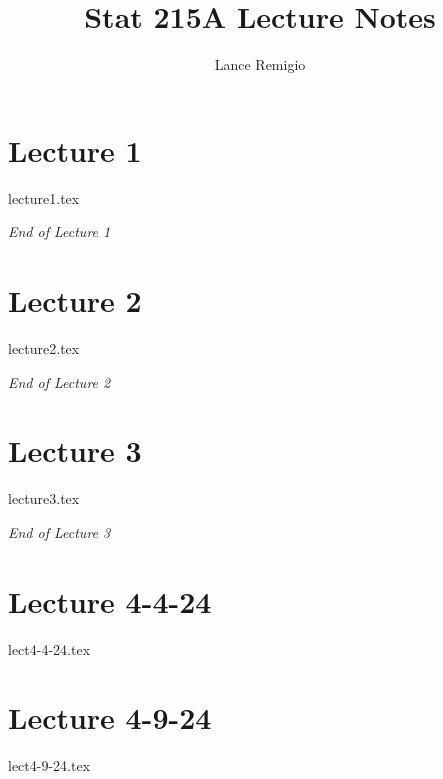 \documentclass[a4paper]{article}
\title{Stat 215A Lecture Notes}
\author{Lance Remigio}
\begin{document}
\maketitle
\tableofcontents

\section{Lecture 1}

{lecture1.tex}

\begin{center}
    \textit{End of Lecture 1} 
\end{center}

\section{Lecture 2}

{lecture2.tex}

\begin{center}
    \textit{End of Lecture 2} 
\end{center}

\section{Lecture 3}


{lecture3.tex}

\begin{center}
    \textit{End of Lecture 3} 
\end{center}

\section{Lecture 4-4-24}

{lect4-4-24.tex}

\section{Lecture 4-9-24}
{lect4-9-24.tex}
\end{document}
